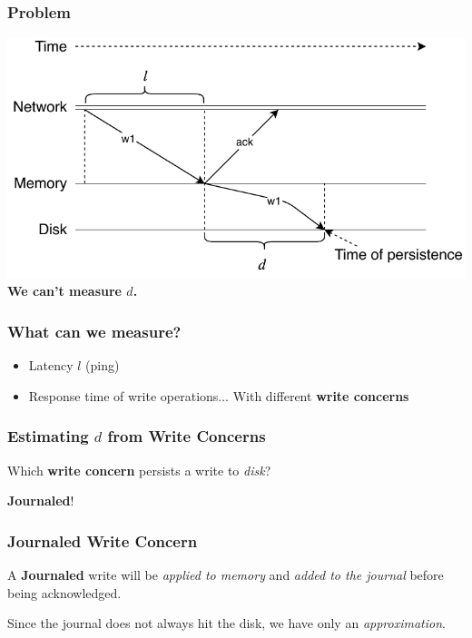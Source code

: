 \documentclass[numfooter,sectionpages,protectFrameTitle, progressbar, cblock, valigncolumns, addlogo]{beamer}
\begin{document}
\begin{frame}
    \frametitle{Problem}

    \begin{center}
        \includegraphics[height=.625\textheight]{../images/write1.pdf} \\
        \textbf{We can't measure $d$.}
    \end{center}

\end{frame}

\begin{frame}
    \frametitle{What can we measure?}

    \begin{itemize}
        \item Latency $l$ (ping)
        \item Response time of write operations... \pause With different \textbf{write concerns}
    \end{itemize}
\end{frame}

\begin{frame}
    \frametitle{Estimating $d$ from Write Concerns}

    Which \textbf{write concern} persists a write to \textit{disk}?
    \pause 

    \textbf{Journaled}!
\end{frame}

\begin{frame}
    \frametitle{Journaled Write Concern}

    A \textbf{Journaled} write will be \textit{applied to memory} and \textit{added to the journal} before being acknowledged. 

    Since the journal does not always hit the disk, we have only an \textit{approximation}.

\end{frame}
\end{document}
